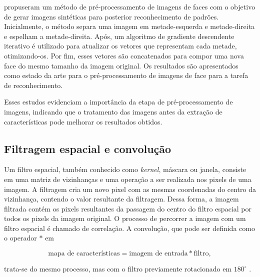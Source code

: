  propuseram um método de pré-processamento de imagens de faces com o objetivo de gerar imagens sintéticas para posterior reconhecimento de padrões. Inicialmente, o método separa uma imagem em metade-esquerda e metade-direita e espelham a metade-direita. Após, um algoritmo de gradiente descendente iterativo é utilizado para atualizar os vetores que representam cada metade, otimizando-os. Por fim, esses vetores são concatenados para compor uma nova face do mesmo tamanho da imagem original. Os resultados são apresentados como estado da arte para o pré-processamento de imagens de face para a tarefa de reconhecimento.

Esses estudos evidenciam a importância da etapa de pré-processamento de imagens, indicando que o tratamento das imagens antes da extração de características pode melhorar os resultados obtidos.

\subsection{Filtragem espacial e convolução}

\label{sec:convolucao}

Um filtro espacial, também conhecido como \textit{kernel}, máscara ou janela, consiste em uma matriz de vizinhanças e uma operação a ser realizada nos pixels de uma imagem. A filtragem cria um novo pixel com as mesmas coordenadas do centro da vizinhança, contendo o valor resultante da filtragem. Dessa forma, a imagem filtrada contém os pixels resultantes da passagem do centro do filtro espacial por todos os pixels da imagem original. O processo de percorrer a imagem com um filtro espacial é chamado de correlação. A convolução, que pode ser definida como o operador $*$ em

\begin{equation*}
\text{mapa de características} = \text{imagem de entrada} * \text{filtro},
\label{eq:conv}
\end{equation*}

\noindent trata-se do mesmo processo, mas com o filtro previamente rotacionado em $180^{\circ}$ \cite{Gonzalez2007}.


